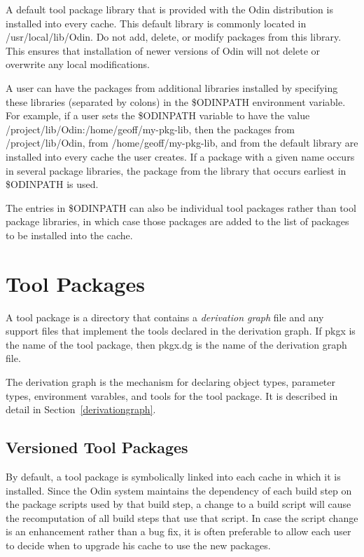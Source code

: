 A default tool package library that is provided with the Odin distribution
is installed into every cache.
This default library is commonly located in {\ex /usr/local/lib/Odin}.
Do not add, delete, or modify packages from this library.
This ensures that installation of newer versions of Odin will not
delete or overwrite any local modifications.

A user can have the packages from additional libraries installed
by specifying these libraries (separated by colons)
in the {\ex \$ODINPATH} environment variable.
For example, if a user sets the {\ex \$ODINPATH} variable to have the value
{\ex /project/lib/Odin:/home/geoff/my-pkg-lib},
then the packages from {\ex /project/lib/Odin},
from {\ex /home/geoff/my-pkg-lib}, and from the default library
are installed into every cache the user creates.
If a package with a given name occurs in several package libraries,
the package from the library that occurs earliest in {\ex \$ODINPATH} is used.

The entries in {\ex \$ODINPATH} can also be individual tool packages
rather than tool package libraries,
in which case those packages are added to the list of packages to be
installed into the cache.


\section{Tool Packages}
\label{package}

A tool package is a directory that contains a {\em derivation graph} file
and any support files that implement the tools
declared in the derivation graph.
If {\ex pkgx} is the name of the tool package,
then {\ex pkgx.dg} is the name of the derivation graph file.

The derivation graph is the mechanism for declaring
object types, parameter types, environment varables,
and tools for the tool package.
It is described in detail in Section~\ref{derivationgraph}.

\subsection{Versioned Tool Packages}

By default, a tool package is symbolically linked into each cache
in which it is installed.
Since the Odin system maintains the dependency of each build step
on the package scripts used by that build step,
a change to a build script will cause the recomputation of all
build steps that use that script.
In case the script change is an enhancement rather than a bug fix,
it is often preferable to allow each user to decide when to upgrade
his cache to use the new packages.

